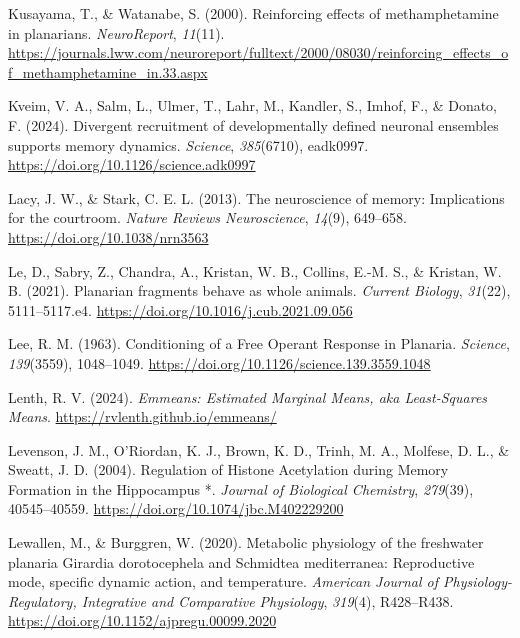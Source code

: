 \documentclass[
  jou,
  floatsintext,
  longtable,
  nolmodern,
  notxfonts,
  notimes,
  donotrepeattitle,
  colorlinks=true,linkcolor=blue,citecolor=blue,urlcolor=blue]{apa7}
\newlength{\cslhangindent}
\newenvironment{CSLReferences}[2] %
 {\begin{list}{}{%
  \setlength{\itemindent}{0pt}
  \setlength{\leftmargin}{0pt}
  \setlength{\parsep}{0pt}
  \ifodd #1
   \setlength{\leftmargin}{\cslhangindent}
   \setlength{\itemindent}{-1\cslhangindent}
  \fi
  \setlength{\itemsep}{#2\baselineskip}}}
 {\end{list}}
\begin{document}
\begin{CSLReferences}{1}{0}
Kusayama, T., \& Watanabe, S. (2000). Reinforcing effects of
methamphetamine in planarians. \emph{NeuroReport}, \emph{11}(11).
\url{https://journals.lww.com/neuroreport/fulltext/2000/08030/reinforcing_effects_of_methamphetamine_in.33.aspx}

Kveim, V. A., Salm, L., Ulmer, T., Lahr, M., Kandler, S., Imhof, F., \&
Donato, F. (2024). Divergent recruitment of developmentally defined
neuronal ensembles supports memory dynamics. \emph{Science},
\emph{385}(6710), eadk0997.
\url{https://doi.org/10.1126/science.adk0997}

Lacy, J. W., \& Stark, C. E. L. (2013). The neuroscience of memory:
Implications for the courtroom. \emph{Nature Reviews Neuroscience},
\emph{14}(9), 649--658. \url{https://doi.org/10.1038/nrn3563}

Le, D., Sabry, Z., Chandra, A., Kristan, W. B., Collins, E.-M. S., \&
Kristan, W. B. (2021). Planarian fragments behave as whole animals.
\emph{Current Biology}, \emph{31}(22), 5111--5117.e4.
\url{https://doi.org/10.1016/j.cub.2021.09.056}

Lee, R. M. (1963). Conditioning of a {Free} {Operant} {Response} in
{Planaria}. \emph{Science}, \emph{139}(3559), 1048--1049.
\url{https://doi.org/10.1126/science.139.3559.1048}

Lenth, R. V. (2024). \emph{Emmeans: {Estimated} {Marginal} {Means}, aka
{Least}-{Squares} {Means}}. \url{https://rvlenth.github.io/emmeans/}

Levenson, J. M., O'Riordan, K. J., Brown, K. D., Trinh, M. A., Molfese,
D. L., \& Sweatt, J. D. (2004). Regulation of {Histone} {Acetylation}
during {Memory} {Formation} in the {Hippocampus} *. \emph{Journal of
Biological Chemistry}, \emph{279}(39), 40545--40559.
\url{https://doi.org/10.1074/jbc.M402229200}

Lewallen, M., \& Burggren, W. (2020). Metabolic physiology of the
freshwater planaria {Girardia} dorotocephela and {Schmidtea}
mediterranea: Reproductive mode, specific dynamic action, and
temperature. \emph{American Journal of Physiology-Regulatory,
Integrative and Comparative Physiology}, \emph{319}(4), R428--R438.
\url{https://doi.org/10.1152/ajpregu.00099.2020}


\end{CSLReferences}
\end{document}
